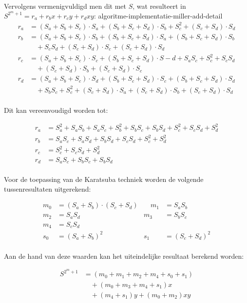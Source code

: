 Vervolgens vermenigvuldigd men dit met $S$, wat resulteert in $S^{2^m + 1} = r_a + r_b x + r_c y + r_d xy$:
algoritme-implementatie-miller-add-detail
\[\begin{aligned}
r_a	&= (S_a + S_b + S_c) \cdot S_a + (S_b + S_c + S_d) \cdot S_b + S_c^2 + (S_c + S_d) \cdot S_d\\
r_b	&= (S_a + S_b + S_c) \cdot S_b + (S_b + S_c + S_d) \cdot S_a + (S_b + S_c + S_d) \cdot S_b\\
		&\quad + S_c S_d + (S_c + S_d) \cdot S_c + (S_c + S_d) \cdot S_d\\
r_c	&= (S_a + S_b + S_c) \cdot S_c + (S_b + S_c + S_d) \cdot S-d + S_a S_c + S_c^2 + S_c S_d\\
		&\quad + (S_c + S_d) \cdot S_b + (S_c + S_d) \cdot S_c\\
r_d	&= (S_a + S_b + S_c) \cdot S_d + (S_b + S_c + S_d) \cdot S_c + (S_b + S_c + S_d) \cdot S_d\\
		&\quad + S_b S_c + S_c^2 + (S_c + S_d) \cdot S_a + (S_c + S_d) \cdot S_b + (S_c + S_d) \cdot S_d\\
\end{aligned}\]

Dit kan vereenvoudigd worden tot:

\[\begin{aligned}
r_a	&= S_a^2 + S_a S_b + S_a S_c + S_b^2 + S_b S_c + S_b S_d + S_c^2 + S_c S_d + S_d^2\\
r_b	&= S_a S_c + S_a S_d + S_b S_d + S_c S_d + S_c^2 + S_d^2\\
r_c	&= S_c^2 + S_c S_d + S_d^2\\
r_d	&= S_a S_c + S_b S_c + S_b S_d\\
\end{aligned}\]

Voor de toepassing van de Karatsuba techniek worden de volgende tussenresultaten uitgerekend:

\[\begin{aligned}
m_0	&= (S_a + S_b) \cdot (S_c + S_d)
			&\quad m_1	&= S_a S_b\\
m_2	&= S_a S_d
			&m_3	&= S_b S_c\\
m_4	&= S_c S_d\\
s_0	&= (S_a + S_b)^2
			&s_1	&= (S_c + S_d)^2\\
\end{aligned}\]

Aan de hand van deze waarden kan het uiteindelijke resultaat berekend worden:

\[\begin{aligned}
S^{2^m + 1}	&= (m_0 + m_1 + m_2 + m_4 + s_0 + s_1)\\
				&\quad + (m_0 + m_3 + m_4 + s_1) x \\
				&\quad + (m_4 + s_1) y + (m_0 + m_2) xy\\
\end{aligned}\]

